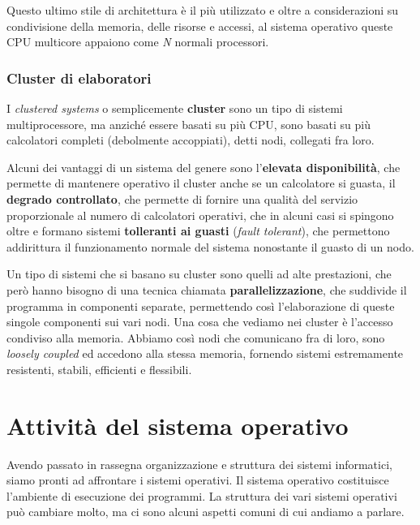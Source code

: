             Questo ultimo stile di architettura è il più utilizzato e oltre a considerazioni su condivisione della memoria, delle risorse e accessi, al sistema operativo queste CPU multicore appaiono come \textit{N} normali processori.
            
            \subsubsection{Cluster di elaboratori}
                I \textit{clustered systems} o semplicemente \textbf{cluster} sono un tipo di sistemi multiprocessore, ma anziché essere basati su più CPU, sono basati su più calcolatori completi (debolmente accoppiati), detti nodi, collegati fra loro.
                
                Alcuni dei vantaggi di un sistema del genere sono l'\textbf{elevata disponibilità}, che permette di mantenere operativo il cluster anche se un calcolatore si guasta, il \textbf{degrado controllato}, che permette di fornire una qualità del servizio proporzionale al numero di calcolatori operativi, che in alcuni casi si spingono oltre e formano sistemi \textbf{tolleranti ai guasti} (\textit{fault tolerant}), che permettono addirittura il funzionamento normale del sistema nonostante il guasto di un nodo.
                
                Un tipo di sistemi che si basano su cluster sono quelli ad alte prestazioni, che però hanno bisogno di una tecnica chiamata \textbf{parallelizzazione}, che suddivide il programma in componenti separate, permettendo così l'elaborazione di queste singole componenti sui vari nodi. Una cosa che vediamo nei cluster è l'accesso condiviso alla memoria. Abbiamo così nodi che comunicano fra di loro, sono \textit{loosely coupled} ed accedono alla stessa memoria, fornendo sistemi estremamente resistenti, stabili, efficienti e flessibili.
                
\section{Attività del sistema operativo}
    Avendo passato in rassegna organizzazione e struttura dei sistemi informatici, siamo pronti ad affrontare i sistemi operativi. Il sistema operativo costituisce l'ambiente di esecuzione dei programmi. La struttura dei vari sistemi operativi può cambiare molto, ma ci sono alcuni aspetti comuni di cui andiamo a parlare.
            
